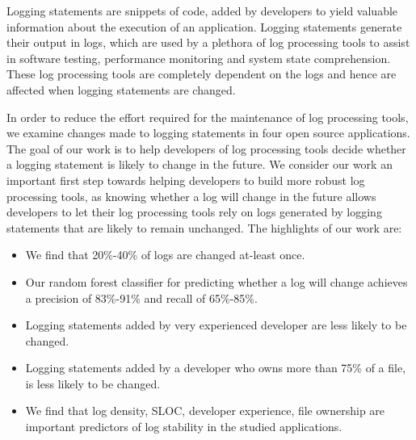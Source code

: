 Logging statements are snippets of code, added by developers to yield valuable information about the execution of an application. Logging statements generate their output in logs, which are used by a plethora of log processing tools to assist in software testing, performance monitoring and system state comprehension. These log processing tools are completely dependent on the logs and hence are affected when logging statements are changed.

In order to reduce the effort required for the maintenance of log processing tools, we examine changes made to logging statements in four open source applications. The goal of our work is to help developers of log processing tools decide whether a logging statement is likely to change in the future. We consider our work an important first step towards helping developers to build more robust log processing tools, as knowing whether a log will change in the future allows developers to let their log processing tools rely on logs generated by logging statements that are likely to remain unchanged. The highlights of our work are:


\begin{itemize}
	\item We find that 20\%-40\%  of logs are changed at-least once.
	\item Our random forest classifier for predicting whether a log will change achieves a precision of 83\%-91\% and recall of 65\%-85\%. 
	\item Logging statements added by very experienced developer are less likely to be changed.
	\item Logging statements added by a developer who owns more than 75\% of a file, is less likely to be changed. 
	\item We find that log density, SLOC, developer experience, file ownership are important predictors of log stability in the studied applications.  	
	
\end{itemize}

